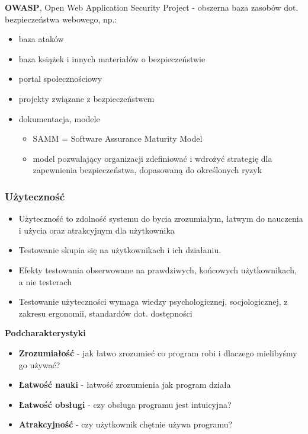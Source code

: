 \documentclass[../main.tex]{subfiles}
\begin{document}
    \textbf{OWASP}, Open Web Application Security Project - obszerna baza zasobów dot. bezpieczeństwa webowego, np.:
    \begin{itemize}
        \item baza ataków
        \item baza książek i innych materiałów o bezpieczeństwie
        \item portal społecznościowy
        \item projekty związane z bezpieczeństwem
        \item dokumentacja, modele
        \begin{itemize}
            \item SAMM = Software Assurance Maturity Model
            \item model pozwalający organizacji zdefiniować i wdrożyć strategię dla zapewnienia bezpieczeństwa,
            dopasowaną do określonych ryzyk
        \end{itemize}
    \end{itemize}

    \subsubsection{Użyteczność}
    \begin{itemize}
        \item Użyteczność to zdolność systemu do bycia zrozumiałym, łatwym do nauczenia i użycia oraz atrakcyjnym dla
        użytkownika
        \item Testowanie skupia się na użytkownikach i ich działaniu.
        \item Efekty testowania obserwowane na prawdziwych, końcowych użytkownikach, a nie testerach
        \item Testowanie użyteczności wymaga wiedzy psychologicznej, socjologicznej, z zakresu ergonomii, standardów dot.
        dostępności
    \end{itemize}


    \textbf{Podcharakterystyki}
    \begin{itemize}
        \item \textbf{Zrozumiałość} - jak łatwo zrozumieć co program robi i dlaczego mielibyśmy go używać?
        \item \textbf{Łatwość nauki} - łatwość zrozumienia jak program działa
        \item \textbf{Łatwość obsługi} - czy obsługa programu jest intuicyjna?
        \item \textbf{Atrakcyjność} - czy użytkownik chętnie używa programu?
    \end{itemize}
\end{document}
